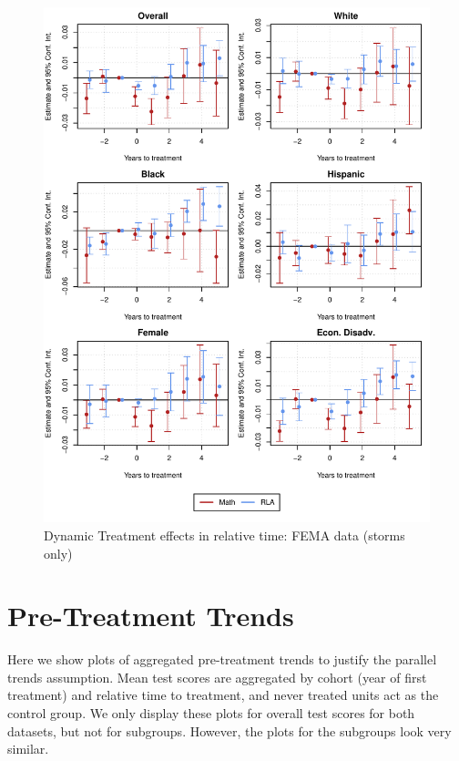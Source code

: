 \begin{figure}[!h]
	\centering
	\includegraphics[scale=1]{"../Code & Data/ResultsPlotFEMAStorm.pdf"}
	\caption{Dynamic Treatment effects in relative time: FEMA data (storms only)}
	\label{ResultsPlotFEMAStorm}
\end{figure}

\newpage

\section{Pre-Treatment Trends} \label{PreTrends}

Here we show plots of aggregated pre-treatment trends to justify the parallel trends assumption. Mean test scores are aggregated by cohort (year of first treatment) and relative time to treatment, and never treated units act as the control group. We only display these plots for overall test scores for both datasets, but not for subgroups. However, the plots for the subgroups look very similar.

